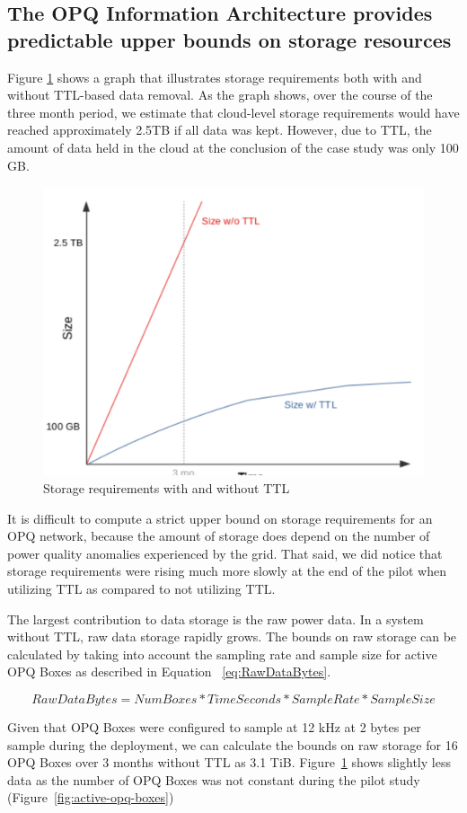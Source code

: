 \subsection{The OPQ Information Architecture provides predictable upper bounds on storage resources}

Figure \ref{fig:data-management-graph} shows a graph that illustrates storage requirements both with and without TTL-based data removal.  As the graph shows, over the course of the three month period, we estimate that cloud-level storage requirements would have reached approximately 2.5TB if all data was kept.  However, due to TTL, the amount of data held in the cloud at the conclusion of the case study was only 100 GB.

\begin{figure}[ht]
  \centering
	\includegraphics[width=0.4\linewidth]{images/pilot/data-management-graph.png}
	\caption{Storage requirements with and without TTL}
	\label{fig:data-management-graph}
\end{figure}

It is difficult to compute a strict upper bound on storage requirements for an OPQ network, because the amount of storage does depend on the number of power quality anomalies experienced by the grid. That said, we did notice that storage requirements were rising much more slowly at the end of the pilot when utilizing TTL as compared to not utilizing TTL.

The largest contribution to data storage is the raw power data. In a system without TTL, raw data storage rapidly grows. The bounds on raw storage can be calculated by taking into account the sampling rate and sample size for active OPQ Boxes as described in Equation ~\ref{eq:RawDataBytes}.

\begin{equation}
    RawDataBytes = NumBoxes * TimeSeconds * SampleRate * SampleSize
    \label{eq:RawDataBytes}
\end{equation}

Given that OPQ Boxes were configured to sample at 12 kHz at 2 bytes per sample during the deployment, we can calculate the bounds on raw storage for 16 OPQ Boxes over 3 months without TTL as 3.1 TiB. Figure~\ref{fig:data-management-graph} shows slightly less data as the number of OPQ Boxes was not constant during the pilot study (Figure~\ref{fig:active-opq-boxes})

